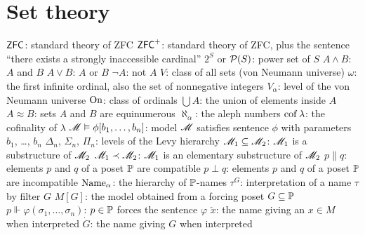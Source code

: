 \section{Set theory}
\begin{itemize}
	\ii $\mathsf{ZFC}$: standard theory of ZFC
	\ii $\mathsf{ZFC}^+$: standard theory of ZFC, plus the sentence
	``there exists a strongly inaccessible cardinal''
	\ii $2^S$ or $\mathcal P(S)$: power set of $S$
	\ii $A \land B$: $A$ and $B$
	\ii $A \lor B$: $A$ or $B$
	\ii $\neg A$: not $A$
	\ii $V$: class of all sets (von Neumann universe)
	\ii $\omega$: the first infinite ordinal, also the set of nonnegative integers
	\ii $V_\alpha$: level of the von Neumann universe
	\ii $\mathrm{On}$: class of ordinals
	\ii $\bigcup A$: the union of elements inside $A$
	\ii $A \approx B$: sets $A$ and $B$ are equinumerous
	\ii $\aleph_\alpha$: the aleph numbers
	\ii $\operatorname{cof} \lambda$: the cofinality of $\lambda$
	\ii $\mathscr M \vDash \phi[b_1, \dots, b_n]$: model $\mathscr M$ satisfies sentence $\phi$
	with parameters $b_1$, \dots, $b_n$
	\ii $\Delta_n$, $\Sigma_n$, $\Pi_n$: levels of the Levy hierarchy
	\ii $\mathscr M_1 \subseteq \mathscr M_2$: $\mathscr M_1$ is a substructure of $\mathscr M_2$
	\ii $\mathscr M_1 \prec \mathscr M_2$: $\mathscr M_1$ is an elementary substructure of $\mathscr M_2$
	\ii $p \parallel q$: elements $p$ and $q$ of a poset $\mathbb P$ are compatible
	\ii $p \perp q$: elements $p$ and $q$ of a poset $\mathbb P$ are incompatible
	\ii $\text{Name}_\alpha$: the hierarchy of $\mathbb P$-names
	\ii $\tau^G$: interpretation of a name $\tau$ by filter $G$
	\ii $M[G]$: the model obtained from a forcing poset $G \subseteq \mathbb P$
	\ii $p \Vdash \varphi(\sigma_1, \dots, \sigma_n)$: $p \in \mathbb P$ forces the sentence $\varphi$
	\ii $\check x$: the name giving an $x \in M$ when interpreted
	\ii $\dot G$: the name giving $G$ when interpreted
\end{itemize}


